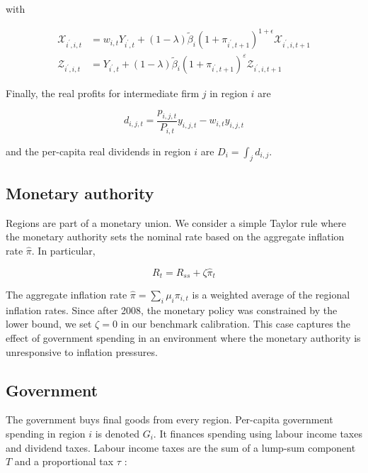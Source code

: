 \documentclass[\latexroot/\projectname]{subfiles}
\begin{document}
with


\begin{align*}
\mathcal{X}_{i^{\prime}, i, t} & =w_{i, t} Y_{i^{\prime}, t}+(1-\lambda) \tilde{\beta}_{i}\left(1+\pi_{i^{\prime}, t+1}\right)^{1+\epsilon} \mathcal{X}_{i^{\prime}, i, t+1}  \tag{4.18}\\
\mathcal{Z}_{i^{\prime}, i, t} & =Y_{i^{\prime}, t}+(1-\lambda) \tilde{\beta}_{i}\left(1+\pi_{i^{\prime}, t+1}\right)^{\varepsilon} \mathcal{Z}_{i^{\prime}, i, t+1} \tag{4.19}
\end{align*}


Finally, the real profits for intermediate firm $j$ in region $i$ are


\begin{equation*}
d_{i, j, t}=\frac{p_{i, j, t}}{P_{i, t}} y_{i, j, t}-w_{i, t} y_{i, j, t} \tag{4.20}
\end{equation*}


and the per-capita real dividends in region $i$ are $D_{i}=\int_{j} d_{i, j}$.

\subsection{Monetary authority}
Regions are part of a monetary union. We consider a simple Taylor rule where the monetary authority sets the nominal rate based on the aggregate inflation rate $\hat{\pi}$. In particular,


\begin{equation*}
R_{t}=R_{s s}+\zeta \hat{\pi}_{t} \tag{4.21}
\end{equation*}


The aggregate inflation rate $\hat{\pi}=\sum_{i} \mu_{i} \pi_{i, t}$ is a weighted average of the regional inflation rates. Since after 2008, the monetary policy was constrained by the lower bound, we set $\zeta=0$ in our benchmark calibration. This case captures the effect of government spending in an environment where the monetary authority is unresponsive to inflation pressures.

\subsection{Government}
The government buys final goods from every region. Per-capita government spending in region $i$ is denoted $G_{i}$. It finances spending using labour income taxes and dividend taxes. Labour income taxes are the sum of a lump-sum component $T$ and a proportional tax $\tau$ :
\end{document}
